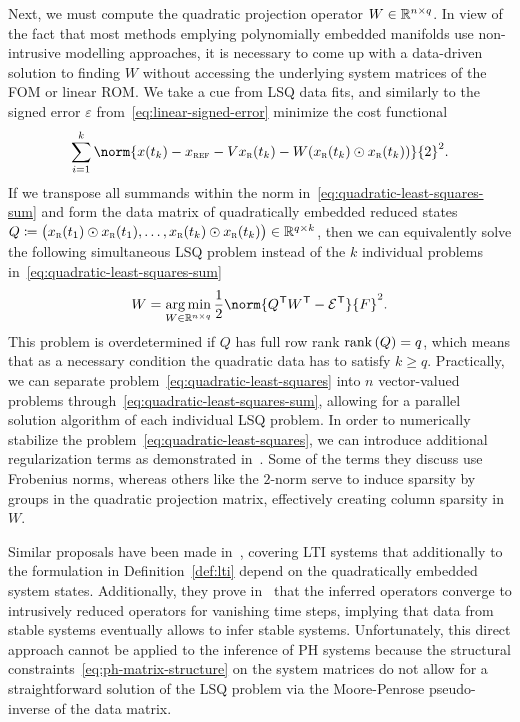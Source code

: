 Next, we must compute the quadratic projection operator $W \in \mathbb{R}^{n \times q}$.
In view of the fact that most methods emplying polynomially embedded manifolds use non-intrusive modelling approaches, it is necessary to come up with a data-driven solution to finding $W$ without accessing the underlying system matrices of the \ac{FOM} or linear \ac{ROM}.
We take a cue from \ac{LSQ} data fits, and similarly to the signed error $\varepsilon$ from~\eqref{eq:linear-signed-error} minimize the cost functional
\begin{equation}\label{eq:quadratic-least-squares-sum}
    \sum\limits_{i = 1}^k \norm{x(t_k) - x_\msc{ref} - V x_\msc{r}(t_k) - W (x_\msc{r}(t_k) \odot x_\msc{r}(t_k))}{2}^2.
\end{equation}
If we transpose all summands within the norm in~\eqref{eq:quadratic-least-squares-sum} and form the data matrix of quadratically embedded reduced states $Q \coloneqq {\big( x_{\textnormal{\scshape r}}(t_1) \odot x_{\textnormal{\scshape r}}(t_1), \dots, x_{\textnormal{\scshape r}}(t_k) \odot x_{\textnormal{\scshape r}}(t_k) \big)} \in \mathbb{R}^{q \times k}$, then we can equivalently solve the following simultaneous \ac{LSQ} problem instead of the $k$ individual problems in~\eqref{eq:quadratic-least-squares-sum}
\begin{equation}\label{eq:quadratic-least-squares}
    W = \argmin\limits_{W \in \bb{R}^{n \times q}} \frac{1}{2} \norm{Q\trans W\trans - \mcl{E}\trans}{F}^2.
\end{equation}
This problem is overdetermined if $Q$ has full row rank $\mathop{}\!\mathrm{rank}\left(Q\right) = q$, which means that as a necessary condition the quadratic data has to satisfy $k \geq q$.
Practically, we can separate problem~\eqref{eq:quadratic-least-squares} into $n$ vector-valued problems through~\eqref{eq:quadratic-least-squares-sum}, allowing for a parallel solution algorithm of each individual \ac{LSQ} problem.
In order to numerically stabilize the problem~\eqref{eq:quadratic-least-squares}, we can introduce additional regularization terms as demonstrated in~\cite[Equation~15]{Geelen2023}.
Some of the terms they discuss use Frobenius norms, whereas others like the $2$-norm serve to induce sparsity by groups in the quadratic projection matrix, effectively creating column sparsity in $W$.

Similar proposals have been made in~\cite{Peherstorfer2016}, covering \ac{LTI} systems that additionally to the formulation in Definition~\ref{def:lti} depend on the quadratically embedded system states.
Additionally, they prove in~\cite[Theorem~1, Corollary~1]{Peherstorfer2016} that the inferred operators converge to intrusively reduced operators for vanishing time steps, implying that data from stable systems eventually allows to infer stable systems.
Unfortunately, this direct approach cannot be applied to the inference of \ac{PH} systems because the structural constraints~\eqref{eq:ph-matrix-structure} on the system matrices do not allow for a straightforward solution of the \ac{LSQ} problem via the Moore-Penrose pseudo-inverse of the data matrix.

